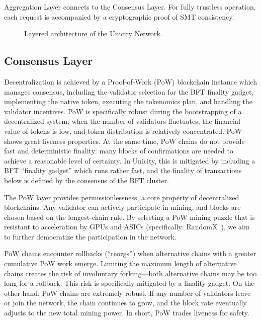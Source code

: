 \documentclass[twocolumn]{article}
\begin{document}
Aggregation Layer connects to the Consensus Layer. For fully trustless operation, each request is accompanied by a cryptographic proof of SMT consistency.

\begin{figure}[!htbp]
    \centering
    \caption{Layered architecture of the Unicity Network.}\label{fig:layers}
\end{figure}


\subsection{Consensus Layer}
Decentralization is achieved by a Proof-of-Work (PoW) blockchain instance which manages consensus, including the validator selection for the BFT finality gadget, implementing the native token, executing the tokenomics plan, and handling the validator incentives. PoW is specifically robust during the bootstrapping of a decentralized system: when the number of validators fluctuates, the financial value of tokens is low, and token distribution is relatively concentrated. PoW shows great liveness properties. At the same time, PoW chains do not provide fast and deterministic finality: many blocks of confirmations are needed to achieve a reasonable level of certainty. In Unicity, this is mitigated by including a BFT ``finality gadget'' which runs rather fast, and the finality of transactions below is defined by the consensus of the BFT cluster.

The PoW layer provides permissionlessness, a core property of decentralized blockchains. Any validator can actively participate in mining, and blocks are chosen based on the longest-chain rule. By selecting a PoW mining puzzle that is resistant to acceleration by GPUs and ASICs (specifically: RandomX~\cite{randomx}), we aim to further democratize the participation in the network.

PoW chains encounter rollbacks (``reorgs'') when alternative chains with a greater cumulative PoW work emerge. Limiting the maximum length of alternative chains creates the risk of involuntary forking---both alternative chains may be too long for a rollback. This risk is specifically mitigated by a finality gadget. On the other hand, PoW chains are extremely robust. If any number of validators leave or join the network, the chain continues to grow, and the block rate eventually adjusts to the new total mining power. In short, PoW trades liveness for safety.
\end{document}
